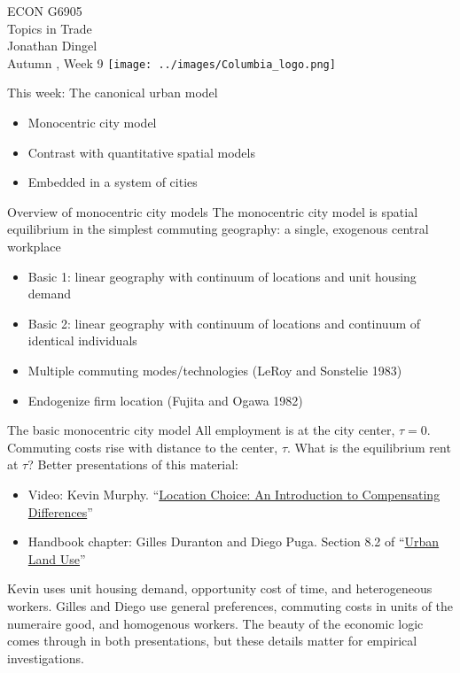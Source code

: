 \documentclass[11pt,notes=hide,aspectratio=169]{beamer}
\begin{document}
\begin{frame}[plain]
\begin{center}
\large
\textcolor{columbiadarkblue}{ECON G6905\\
Topics in Trade\\ 
Jonathan Dingel\\
Autumn \the\year, Week 9}
\vfill 
\texttt{[image: ../images/Columbia\_logo.png]}
\end{center}
\end{frame}
\begin{frame}{This week: The canonical urban model}
\begin{itemize}
\item Monocentric city model
\item Contrast with quantitative spatial models
\item Embedded in a system of cities
\end{itemize}
\end{frame}
\begin{frame}{Overview of monocentric city models}
The monocentric city model is spatial equilibrium in the simplest commuting geography: a single, exogenous central workplace
\begin{itemize}
\item Basic 1: linear geography with continuum of locations and unit housing demand
\item Basic 2: linear geography with continuum of locations and continuum of identical individuals 
\item Multiple commuting modes/technologies (LeRoy and Sonstelie 1983)
\item Endogenize firm location (Fujita and Ogawa 1982)
\end{itemize}
\end{frame}
\begin{frame}{The basic monocentric city model}
All employment is at the city center, $\tau = 0$.
Commuting costs rise with distance to the center, $\tau$.
What is the equilibrium rent at $\tau$?
Better presentations of this material:
\begin{itemize}
\item Video: Kevin Murphy. ``\href{https://www.youtube.com/playlist?list=PLp2AOdiHSxGeV8AwAwm7nye_2QsQHiC6D}{Location Choice: An Introduction to Compensating Differences}''
\item Handbook chapter: Gilles Duranton and Diego Puga. Section 8.2 of ``\href{https://doi.org/10.1016/B978-0-444-59517-1.00008-8}{Urban Land Use}'' 
\end{itemize}
Kevin uses unit housing demand, opportunity cost of time, and heterogeneous workers.
Gilles and Diego use general preferences, commuting costs in units of the numeraire good, and homogenous workers.
The beauty of the economic logic comes through in both presentations,
but these details matter for empirical investigations.
\end{frame}
\end{document}

